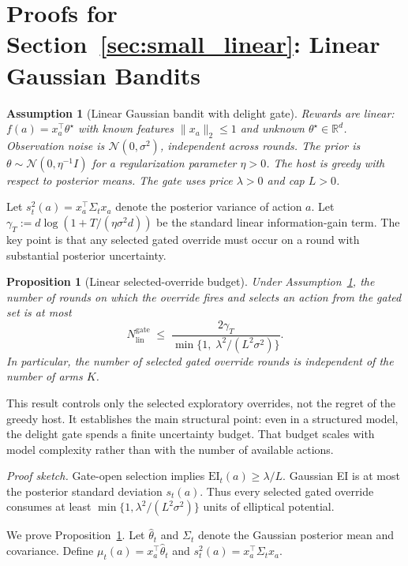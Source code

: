 \documentclass{article}
\newtheorem{proposition} {Proposition}
\newtheorem{assumption} {Assumption}
\newcommand{\EI}{\mathrm{EI}} %
\begin{document}
\section{Proofs for Section~\ref{sec:small_linear}: Linear Gaussian Bandits}
\label{app:proofs_linear}

\begin{assumption}[Linear Gaussian bandit with delight gate]
\label{assump:lg}
Rewards are linear: $f(a) = x_a^\top \theta^\star$ with known features $\|x_a\|_2 \le 1$ and unknown $\theta^\star \in \mathbb{R}^d$.
Observation noise is $\mathcal{N}(0, \sigma^2)$, independent across rounds.
The prior is $\theta \sim \mathcal{N}(0, \eta^{-1}I)$ for a regularization parameter $\eta > 0$.
The host is greedy with respect to posterior means.
The gate uses price $\lambda > 0$ and cap $L > 0$.
\end{assumption}

Let $s_t^2(a) = x_a^\top \Sigma_t x_a$ denote the posterior variance of action $a$.
Let $\gamma_T := d\log(1 + T/(\eta\sigma^2 d))$ be the standard linear information-gain term.
The key point is that any selected gated override must occur on a round with substantial posterior uncertainty.

\begin{proposition}[Linear selected-override budget]
\label{prop:linear_gate_budget}
Under Assumption~\ref{assump:lg}, the number of rounds on which the override fires and selects an action from the gated set is at most
\[
N^{\mathrm{gate}}_{\mathrm{lin}}
\;\le\;
\frac{2\gamma_T}{\min\{1,\;\lambda^2/(L^2\sigma^2)\}}.
\]
In particular, the number of selected gated override rounds is independent of the number of arms $K$.
\end{proposition}

This result controls only the selected exploratory overrides, not the regret of the greedy host.
It establishes the main structural point: even in a structured model, the delight gate spends a finite uncertainty budget.
That budget scales with model complexity rather than with the number of available actions.

\noindent\textit{Proof sketch.}
Gate-open selection implies $\EI_t(a)\ge\lambda/L$.
Gaussian EI is at most the posterior standard deviation $s_t(a)$.
Thus every selected gated override consumes at least $\min\{1,\lambda^2/(L^2\sigma^2)\}$ units of elliptical potential.

We prove Proposition~\ref{prop:linear_gate_budget}.
Let $\hat\theta_t$ and $\Sigma_t$ denote the Gaussian posterior mean and covariance.
Define $\mu_t(a) = x_a^\top\hat\theta_t$ and $s_t^2(a) = x_a^\top\Sigma_t x_a$.
\end{document}
